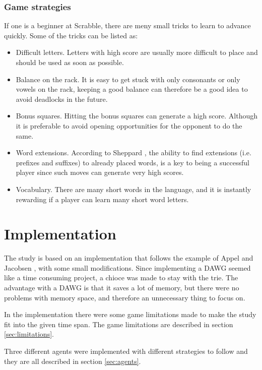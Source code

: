 \documentclass[a4paper, 12pt]{report}
\begin{document}
\subsection{Game strategies}
\label{sec:strategies}
If one is a beginner at Scrabble, there are meny small tricks to learn to advance quickly. Some of the tricks can be listed as:

\begin{itemize}
\item Difficult letters. Letters with high score are usually more difficult to place and should be used as soon as possible.
\item Balance on the rack. It is easy to get stuck with only consonants or only vowels on the rack, keeping a good balance can therefore be a good idea to avoid deadlocks in the future.
\item Bonus squares. Hitting the bonus squares can generate a high score. Although it is preferable to avoid opening opportunities for the opponent to do the same.
\item Word extensions. According to Sheppard \cite{perfectgame}, the ability to find extensions (i.e. prefixes and suffixes) to already placed words, is a key to being a successful player since such moves can generate very high scores.
\item Vocabulary. There are many short words in the language, and it is instantly rewarding if a player can learn many short word letters.
\end{itemize}






\chapter{Implementation}
The study is based on an implementation that follows the example of Appel and Jacobsen \cite{fastest}, with some small modifications. Since implementing a DAWG seemed like a time consuming project, a chioce was made to stay with the trie. The advantage with a DAWG is that it saves a lot of memory, but there were no problems with memory space, and therefore an unnecessary thing to focus on.

In the implementation there were some game limitations made to make the study fit into the given time span. The game limitations are described in section \ref{sec:limitations}.

Three different agents were implemented with different strategies to follow and they are all described in section \ref{sec:agents}.
\end{document}
